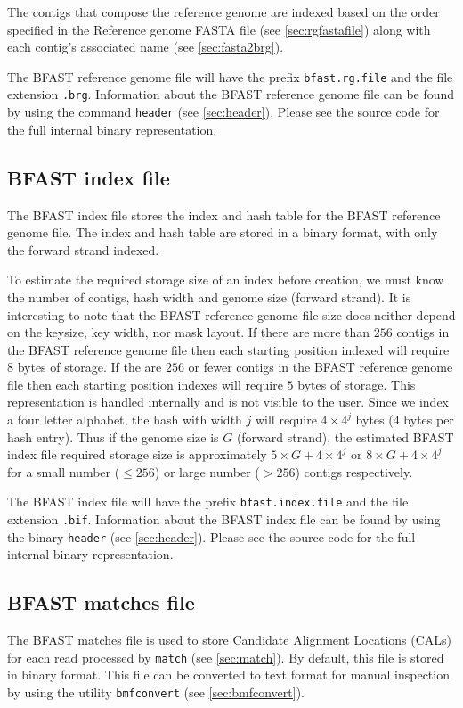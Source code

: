 \documentclass[a4paper,12pt]{book}
\newcommand{\TT}[1]{{\tt #1}} %
\newcommand{\RGFF}{Reference genome FASTA file}
\newcommand{\BRGF}{BFAST reference genome file} %
\newcommand{\BIF}{BFAST index file} %
\newcommand{\BMF}{BFAST matches file} %
\begin{document}
The contigs that compose the reference genome are indexed based on the order specified in the \RGFF{} (see \autoref{sec:rgfastafile}) along with each contig's associated name (see \autoref{sec:fasta2brg}).

The \BRGF{} will have the prefix \TT{bfast.rg.file} and the file extension \TT{.brg}.
Information about the \BRGF{} can be found by using the command \TT{header} (see \autoref{sec:header}).
Please see the source code for the full internal binary representation.

\subsection{\BIF{}}
\label{sec:bif}
The \BIF{} stores the index and hash table for the \BRGF{}.
The index and hash table are stored in a binary format, with only the forward strand indexed.

To estimate the required storage size of an index before creation, we must know the number of contigs, hash width and genome size (forward strand).
It is interesting to note that the \BRGF{} size does neither depend on the keysize, key width, nor mask layout. 
If there are more than $256$ contigs in the \BRGF{} then each starting position indexed will require $8$ bytes of storage.
If the are $256$ or fewer contigs in the \BRGF{} then each starting position indexes will require $5$ bytes of storage.
This representation is handled internally and is not visible to the user.
Since we index a four letter alphabet, the hash with width $j$ will require $4\times4^j$ bytes ($4$ bytes per hash entry).
Thus if the genome size is $G$ (forward strand), the estimated \BIF{} required storage size is approximately $5\times G + 4\times 4^j$ or $8\times G + 4\times 4^j$ for a small number ($\leq 256$) or large number ($>256$) contigs respectively. 

The \BIF{} will have the prefix \TT{bfast.index.file} and the file extension \TT{.bif}.
Information about the \BIF{} can be found by using the binary \TT{header} (see \autoref{sec:header}).
Please see the source code for the full internal binary representation.

\subsection{\BMF{}}
\label{sec:bmf}
The \BMF{} is used to store Candidate Alignment Locations (CALs) for each read processed by \TT{match} (see \autoref{sec:match}).
By default, this file is stored in binary format.
This file can be converted to text format for manual inspection by using the utility \TT{bmfconvert} (see \autoref{sec:bmfconvert}).
\end{document}
